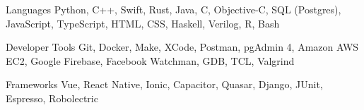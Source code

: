 

\begin{cvskills}


  \cvskill
    {Languages} %
    {Python, C++, Swift, Rust, Java, C, Objective-C, SQL (Postgres), JavaScript, TypeScript, HTML, CSS, Haskell, Verilog, R, Bash} %

  \cvskill
    {Developer Tools} %
    {Git, Docker, Make, XCode, Postman, pgAdmin 4, Amazon AWS EC2, Google Firebase, Facebook Watchman, GDB, TCL, Valgrind} %

  \cvskill
  {Frameworks} %
  {Vue, React Native, Ionic, Capacitor, Quasar, Django, JUnit, Espresso, Robolectric} %

\end{cvskills}
